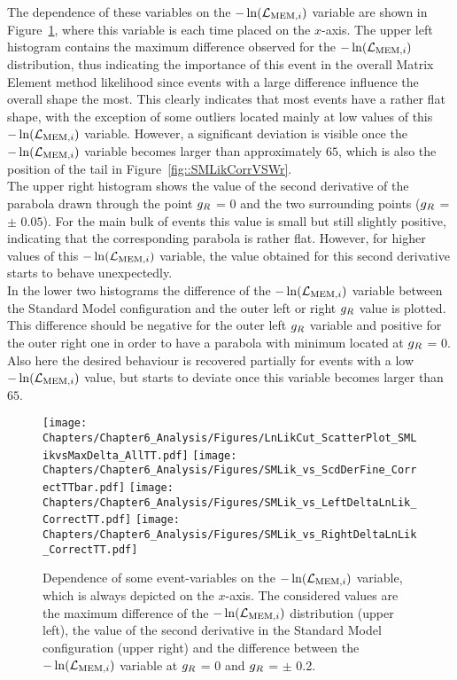 The dependence of these variables on the $-\ln(\mathcal{L}_{\textrm{MEM}, i})$ variable are shown in Figure~\ref{fig::SMLik2D}, where this variable is each time placed on the $x$-axis.
The upper left histogram contains the maximum difference observed for the $-\ln(\mathcal{L}_{\textrm{MEM}, i})$ distribution, thus indicating the importance of this event in the overall Matrix Element method likelihood since events with a large difference influence the overall shape the most. 
This clearly indicates that most events have a rather flat shape, with the exception of some outliers located mainly at low values of this $-\ln(\mathcal{L}_{\textrm{MEM}, i})$ variable. However, a significant deviation is visible once the $-\ln(\mathcal{L}_{\textrm{MEM}, i})$ variable becomes larger than approximately $65$, which is also the position of the tail in Figure~\ref{fig::SMLikCorrVSWr}.
\\
The upper right histogram shows the value of the second derivative of the parabola drawn through the point $g_{R}$ = $0$ and the two surrounding points ($g_{R}$ = $\pm$ $0.05$). 
For the main bulk of events this value is small but still slightly positive, indicating that the corresponding parabola is rather flat. However, for higher values of this $-\ln(\mathcal{L}_{\textrm{MEM}, i})$ variable, the value obtained for this second derivative starts to behave unexpectedly.
\\
In the lower two histograms the difference of the $-\ln(\mathcal{L}_{\textrm{MEM}, i})$ variable between the Standard Model configuration and the outer left or right $g_{R}$ value is plotted.
This difference should be negative for the outer left $g_{R}$ variable and positive for the outer right one in order to have a parabola with minimum located at $g_{R}$ = 0.
Also here the desired behaviour is recovered partially for events with a low $-\ln(\mathcal{L}_{\textrm{MEM}, i})$ value, but starts to deviate once this variable becomes larger than $65$.
\begin{figure}[h!t]
 \centering
 \texttt{[image: Chapters/Chapter6\_Analysis/Figures/LnLikCut\_ScatterPlot\_SMLikvsMaxDelta\_AllTT.pdf]}
 \texttt{[image: Chapters/Chapter6\_Analysis/Figures/SMLik\_vs\_ScdDerFine\_CorrectTTbar.pdf]}
 \texttt{[image: Chapters/Chapter6\_Analysis/Figures/SMLik\_vs\_LeftDeltaLnLik\_CorrectTT.pdf]}
 \texttt{[image: Chapters/Chapter6\_Analysis/Figures/SMLik\_vs\_RightDeltaLnLik\_CorrectTT.pdf]}
 \caption{Dependence of some event-variables on the $-\ln(\mathcal{L}_{\textrm{MEM}, i})$ variable, which is always depicted on the $x$-axis. The considered values are the maximum difference of the $-\ln(\mathcal{L}_{\textrm{MEM}, i})$ distribution (upper left), the value of the second derivative in the Standard Model configuration (upper right) and the difference between the $-\ln(\mathcal{L}_{\textrm{MEM}, i})$ variable at $g_{R}$ = 0 and $g_{R}$ = $\pm$ 0.2.} \label{fig::SMLik2D}
\end{figure}

